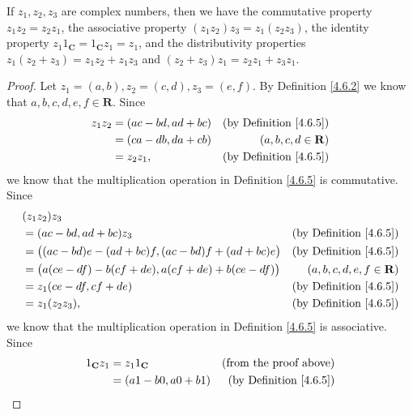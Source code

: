 \begin{lemma}\label{4.6.6}
    If \(z_1, z_2, z_3\) are complex numbers, then we have the commutative property \(z_1 z_2 = z_2 z_1\), the associative property \((z_1 z_2) z_3 = z_1 (z_2 z_3)\), the identity property \(z_1 1_{\mathbf{C}} = 1_{\mathbf{C}} z_1 = z_1\), and the distributivity properties \(z_1 (z_2 + z_3) = z_1 z_2 + z_1 z_3\) and \((z_2 + z_3) z_1 = z_2 z_1 + z_3 z_1\).
\end{lemma}

\begin{proof}
    Let \(z_1 = (a, b), z_2 = (c, d), z_3 = (e, f)\).
    By Definition \ref{4.6.2} we know that \(a, b, c, d, e, f \in \mathbf{R}\).
    Since
    \begin{align*}
        z_1 z_2 & = (ac - bd, ad + bc) & \text{(by Definition \ref{4.6.5})} \\
                & = (ca - db, da + cb) & (a, b, c, d \in \mathbf{R})        \\
                & = z_2 z_1,           & \text{(by Definition \ref{4.6.5})}
    \end{align*}
    we know that the multiplication operation in Definition \ref{4.6.5} is commutative.
    Since
    \begin{align*}
         & (z_1 z_2) z_3                                                                                         \\
         & = (ac - bd, ad + bc) z_3                                         & \text{(by Definition \ref{4.6.5})} \\
         & = \big((ac - bd) e - (ad + bc) f, (ac - bd) f + (ad + bc) e\big) & \text{(by Definition \ref{4.6.5})} \\
         & = \big(a (ce - df) - b (cf + de), a (cf + de) + b (ce - df)\big) & (a, b, c, d, e, f \in \mathbf{R})  \\
         & = z_1 (ce - df, cf + de)                                         & \text{(by Definition \ref{4.6.5})} \\
         & = z_1 (z_2 z_3),                                                 & \text{(by Definition \ref{4.6.5})}
    \end{align*}
    we know that the multiplication operation in Definition \ref{4.6.5} is associative.
    Since
    \begin{align*}
        1_{\mathbf{C}} z_1 & = z_1 1_{\mathbf{C}}     & \text{(from the proof above)}      \\
                           & = (a 1 - b 0, a 0 + b 1) & \text{(by Definition \ref{4.6.5})} \\

\end{align*}
\end{proof}
